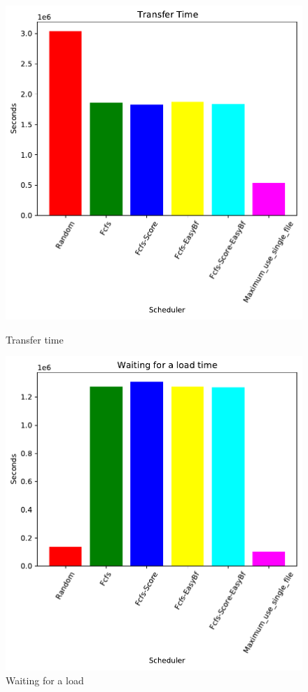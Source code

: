 \documentclass[a4paper]{article}
\begin{document}
	\begin{figure}[H] 
	\begin{minipage}[b]{0.5\linewidth}\centering\includegraphics[width=1\linewidth]{MBSS/plot/2022-03-16_Transfer_time450_128_32_256_4_1024.pdf}\caption{Transfer time}\vspace{4ex}\end{minipage}
	\begin{minipage}[b]{0.5\linewidth}\centering\includegraphics[width=1\linewidth]{MBSS/plot/2022-03-16_Waiting_for_a_load_time450_128_32_256_4_1024.pdf}\caption{Waiting for a load}\vspace{4ex}\end{minipage} 

\end{figure}
\end{document}
